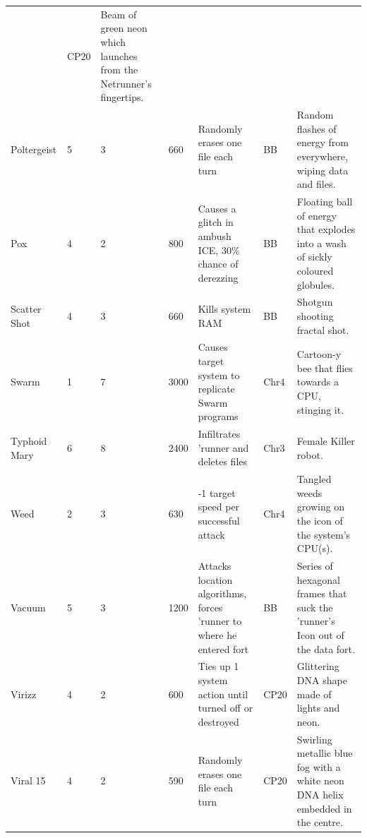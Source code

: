 \documentclass[11pt,twoside,a4paper]{article}
\begin{document}
\begin{landscape}
\begin{longtable}[ht]{ p{3.00cm} p{0.75cm} p{0.75cm} p{1.25cm} p{10.00cm} p{0.75cm} p{7.50cm} }
		&	CP20	&		Beam of green neon which launches from the Netrunner's fingertips.	\\
	Poltergeist				&	5	&	3	&	660	&	Randomly erases one file each turn	
		&	BB	&		Random flashes of energy from everywhere, wiping data and files.	\\
	Pox						&	4	&	2	&	800	&	Causes a glitch in ambush ICE, 30\% chance of derezzing	
		&	BB	&		Floating ball of energy that explodes into a wash of sickly coloured globules.	\\
	Scatter Shot			&	4	&	3	&	660	&	Kills system RAM	
		&	BB	&		Shotgun shooting fractal shot.	\\
	Swarm					&	1	&	7	&	3000	&	Causes target system to replicate Swarm programs	
		&	Chr4	&		Cartoon-y bee that flies towards a CPU, stinging it.	\\
	Typhoid Mary			&	6	&	8	&	2400	&	Infiltrates 'runner and deletes files	
		&	Chr3	&		Female Killer robot.	\\
	Weed					&	2	&	3	&	630	&	-1 target speed per successful attack	
		&	Chr4	&		Tangled weeds growing on the icon of the system's CPU(s).	\\
	Vacuum					&	5	&	3	&	1200	&	Attacks location algorithms, forces 'runner to where he entered fort	
		&	BB	&		Series of hexagonal frames that suck the 'runner's Icon out of the data fort.	\\
	Virizz					&	4	&	2	&	600	&	Ties up 1 system action until turned off or destroyed	
		&	CP20	&		Glittering DNA shape made of lights and neon.	\\
	Viral 15				&	4	&	2	&	590	&	Randomly erases one file each turn	
		&	CP20	&		Swirling metallic blue fog with a white neon DNA helix embedded in the centre.	\\



\end{longtable}
\end{landscape}
\end{document}

